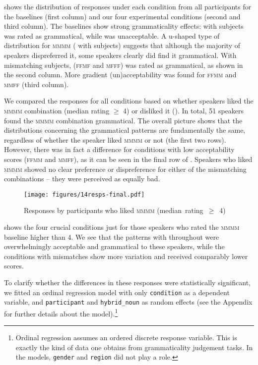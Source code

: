 \documentclass[output=paper,modfonts,newtxmath,hidelinks]{langscibook}
\begin{document}
 shows the distribution of responses under each condition from all participants for the baselines (first column) and our four experimental conditions (second and third column). The baselines show strong grammaticality effects:   with  subjects was rated as grammatical, while   was unacceptable. A u-shaped
type of distribution for \textsc{mmmm} (  with  subjects) suggests that although the majority of
speakers dispreferred it, some speakers clearly did find it grammatical. With mismatching subjects,   (\textsc{ffmf} and \textsc{mfff}) was rated as grammatical, as shown in the second column. More gradient (un)acceptability was found for  \textsc{ffmm} and \textsc{mmff} (third column).

We compared the responses for all conditions based on whether speakers liked the \textsc{mmmm} combination (median rating $\geq$ 4) or disliked it (). In total, 51 speakers found the \textsc{mmmm} combination grammatical. The overall picture shows that the distributions concerning the grammatical patterns are fundamentally the same, regardless of whether the speaker liked \textsc{mmmm} or not (the first two rows). However, there was in fact a difference for conditions with low acceptability scores (\textsc{ffmm} and \textsc{mmff}), as it can be seen in the final row of . Speakers who liked \textsc{mmmm} showed no clear preference or dispreference for either of the mismatching combinations -- they were perceived as equally bad.

\begin{figure}[b]
	\centering
	\texttt{[image: figures/14resps-final.pdf]}
	\caption{Responses by participants who liked \textsc{mmmm} \mbox{(median rating $\geq$ 4)\hspace*{-6mm}}}\label{14:fig:resps-final}
\end{figure}

 shows the four crucial conditions just for those speakers who rated the \textsc{mmmm} baseline higher than 4. We see that the patterns with   throughout were overwhelmingly acceptable and grammatical to these speakers, while the conditions with mismatches show more variation and received comparably lower scores.

To clarify whether the differences in these responses  were statistically significant, we fitted an ordinal regression model with only \texttt{condition} as a dependent variable, and \texttt{participant} and \texttt{hybrid\_noun} as random effects (see the Appendix for further details about the model).\footnote{Ordinal regression assumes an ordered discrete response variable. This is exactly the kind of data one obtains from grammaticality judgement tasks. In the models, \texttt{gender} and \texttt{region} did not play a role.}		
 
\end{document}
